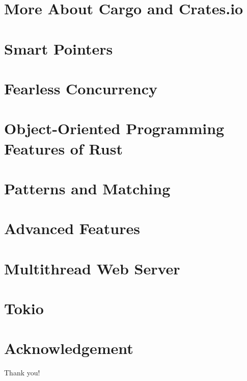 \documentclass{beamer}
\begin{document}
 
 
\section{More About Cargo and Crates.io}
\section{Smart Pointers}
\section{Fearless Concurrency}
\section{Object-Oriented Programming Features of Rust}
\section{Patterns and Matching}
\section{Advanced Features}
\section{Multithread Web Server}
\section{Tokio}

\section*{Acknowledgement}
\begin{frame}
	\Huge{\centerline{Thank you!}}
\end{frame}
\end{document}
